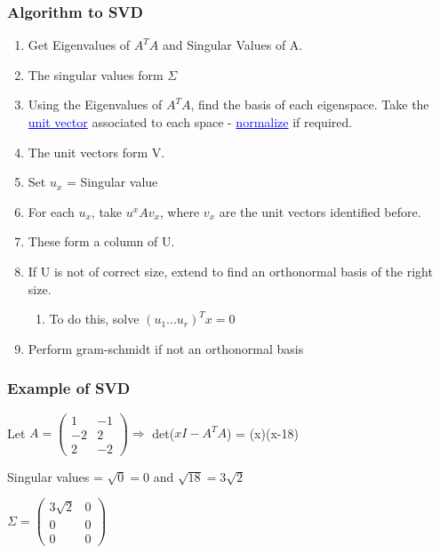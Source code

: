 \documentclass{article}
\newcommand{\bul}[1]{\textcolor{blue}{\underline{#1}}}
\newcommand{\sbreak}{\vspace{10pt}}
\begin{document}
\subsubsection{Algorithm to SVD}
\begin{enumerate}
    \item Get Eigenvalues of $A^TA$ and Singular Values of A.
    \item The singular values form $\Sigma$
    \item Using the Eigenvalues of $A^TA$, find the basis of each eigenspace. Take the \bul{unit vector} associated to each space - \bul{normalize} if required.
    \item The unit vectors form V.
    \item Set $u_x$ = Singular value
    \item For each $u_x$, take $u^xAv_x$, where $v_x$ are the unit vectors identified before.
    \item These form a column of U.
    \item If U is not of correct size, extend to find an orthonormal basis of the right size.
    \begin{enumerate}
        \item To do this, solve $(u_1 ... u_r)^Tx=0$
    \end{enumerate}
    \item Perform gram-schmidt if not an orthonormal basis
\end{enumerate}

\subsubsection{Example of SVD}
Let $ A = \begin{pmatrix}
    1 & -1\\
    -2 & 2\\
    2 & -2
\end{pmatrix} \Rightarrow$  det($xI-A^TA$) = (x)(x-18)

\sbreak

Singular values = $\sqrt{0}=0$ and $\sqrt{18}=3\sqrt{2}$

\sbreak

$\Sigma = \begin{pmatrix}
    3\sqrt{2} & 0\\
    0 & 0\\
    0 & 0
\end{pmatrix}$

\sbreak
\end{document}
